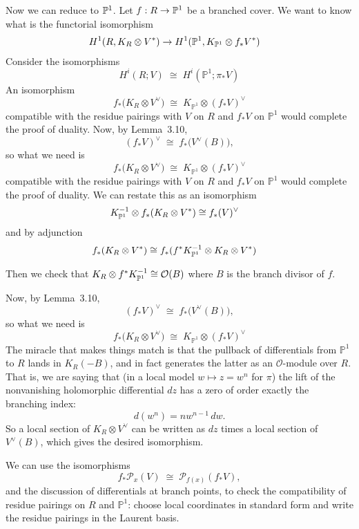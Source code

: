 \documentclass[12pt]{article}
\begin{document}
Now we can reduce to $\P^1$. Let $f: R \to \P^1$ be a branched cover. We want to know what is the functorial isomorphism \begin{align*}
    H^1(R, K_R \otimes V^*) & \to H^1(\P^1, K_{\P^1} \otimes f_* V^*)
\end{align*} Consider the isomorphisms
\[
H^i(R;V) \;\cong\; H^i(\mathbb{P}^1;\pi_*V)
\]
An isomorphism
\[
f_*\bigl(K_R \otimes V^\vee\bigr)
\;\cong\;
K_{\mathbb{P}^1} \otimes (f_*V)^\vee
\]
compatible with the residue pairings with $V$ on $R$ and $f_*V$ on $\mathbb{P}^1$
would complete the proof of duality. Now, by Lemma~3.10,
\[
(f_*V)^\vee \;\cong\; f_*\bigl(V^\vee(B)\bigr),
\]
so what we need is
\[
f_*\bigl(K_R \otimes V^\vee\bigr)
\;\cong\;
K_{\mathbb{P}^1} \otimes (f_*V)^\vee
\]
compatible with the residue pairings with $V$ on $R$ and $f_*V$ on $\mathbb{P}^1$
would complete the proof of duality. We can restate this as an isomorphism 
\begin{align*}
    K_{\P^1}^{-1} \otimes f_*(K_R \otimes V^*) & \cong f_*(V)^{\vee}
\end{align*} and by adjunction \begin{align*}
    f_*(K_R \otimes V^*) & \cong f_*(f^* K_{\P^1}^{-1} \otimes K_R \otimes V^*)
\end{align*}

Then we check that $K_R \otimes f^* K_{\P^1}^{-1} \cong \cO(B)$ where $B$ is the branch divisor of $f$.

Now, by Lemma~3.10,
\[
(f_*V)^\vee \;\cong\; f_*\bigl(V^\vee(B)\bigr),
\]
so what we need is
\[
f_*\bigl(K_R \otimes V^\vee\bigr)
\;\cong\;
K_{\mathbb{P}^1} \otimes (f_*V)^\vee
\]
The miracle that makes things match is that the pullback of differentials from
$\mathbb{P}^1$ to $R$ lands in $K_R(-B)$, and in fact generates the latter as an
$\mathcal{O}$-module over $R$. That is, we are saying that (in a local model
$w \mapsto z = w^n$ for $\pi$) the lift of the nonvanishing holomorphic differential
$dz$ has a zero of order exactly the branching index:
\[
d(w^n) = n w^{n-1} \, dw.
\]
So a local section of $K_R \otimes V^\vee$ can be written as $dz$ times a local
section of $V^\vee(B)$, which gives the desired isomorphism.

We can use the isomorphisms
\[
f_*\mathcal{P}_x(V) \;\cong\; \mathcal{P}_{f(x)}(f_*V),
\]
and the discussion of differentials at branch points, to check the compatibility of
residue pairings on $R$ and $\mathbb{P}^1$: choose local coordinates in standard
form and write the residue pairings in the Laurent basis.
\end{document}
